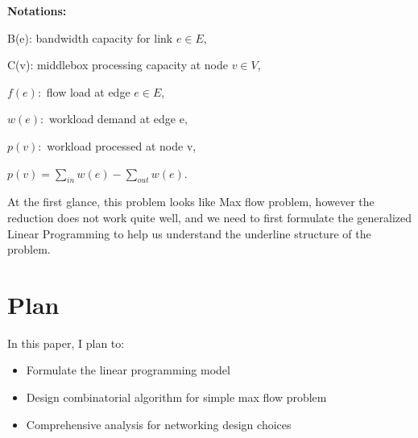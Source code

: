 \documentclass[twoside,leqno, 11pt]{article}
\begin{document}
\textbf{Notations:}

B(e): bandwidth capacity for link $e \in E$,

C(v): middlebox processing capacity at node $v \in V$,

$ f(e): $  flow load at edge $e\in E $, 

$ w(e):$ workload demand at edge e, 

$p(v): $   workload processed at node v,

$p(v) = \sum\limits_{in } w(e) - \sum\limits_{out} w(e)  $. 
 
 At the first glance, this problem looks like Max flow problem, however the reduction does not work quite well, and we need to first formulate the generalized Linear Programming to help us understand the underline structure of the problem. 
 \section{Plan}
 In this paper, I plan to:
 \begin{itemize}
 \item{Formulate the linear programming model}
 \item{Design combinatorial algorithm for simple max flow problem}
 \item{Comprehensive analysis for networking design choices}
 \end{itemize}




\end{document}
